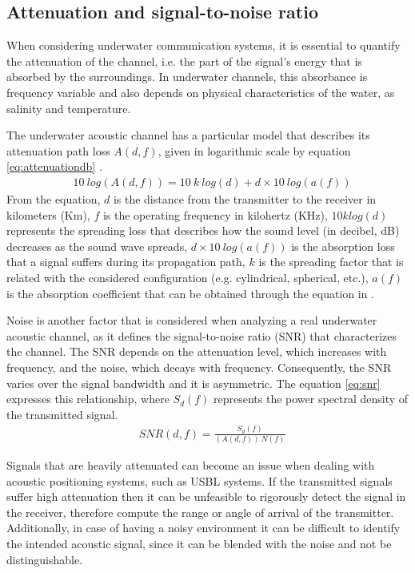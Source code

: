 \subsection{Attenuation and signal-to-noise ratio} \label{subsec:snr}

When considering underwater communication systems, it is essential to quantify the attenuation of the channel, i.e. the part of the signal's energy that is absorbed by the surroundings. In underwater channels, this absorbance is frequency variable and also depends on physical characteristics of the water, as salinity and temperature. 

The underwater acoustic channel has a particular model that describes its attenuation path loss \(A(d,f)\), given in logarithmic scale by equation \ref{eq:attenuationdb} \cite{pathloss}. 
\begin{eqnarray}
&10\ log(A(d,f)) = 10\ k\ log(d) + d \times 10\ log(a(f))
\label{eq:attenuationdb}
\end{eqnarray}
From the equation, \(d\) is the distance from the transmitter to the receiver in kilometers (Km), \(f\) is the operating frequency in kilohertz (KHz), \(10klog(d)\) represents the spreading loss that describes how the sound level (in decibel, dB) decreases as the sound wave spreads, \(d \times 10 \ log(a(f))\) is the absorption loss that a signal suffers during its propagation path, \(k\) is the spreading factor that is related with the considered configuration (e.g. cylindrical, spherical, etc.), \(a(f)\) is the absorption coefficient that can be obtained through the equation in \cite{pathloss}.

Noise is another factor that is considered when analyzing a real underwater acoustic channel, as it defines the signal-to-noise ratio (SNR) that characterizes the channel. The SNR depends on the attenuation level, which increases with frequency, and the noise, which decays with frequency. Consequently, the SNR varies over the signal bandwidth and it is asymmetric. The equation \ref{eq:snr} \cite{commchan} expresses this relationship, where \(S_{d}(f)\) represents the power spectral density of the transmitted signal.
\begin{eqnarray}
&SNR(d,f) = \frac{S_{d}(f)}{(A(d,f))\ N(f)}
\label{eq:snr}
\end{eqnarray}

Signals that are heavily attenuated can become an issue when dealing with acoustic positioning systems, such as USBL systems. If the transmitted signals suffer high attenuation then it can be unfeasible to rigorously detect the signal in the receiver, therefore compute the range or angle of arrival of the transmitter. Additionally, in case of having a noisy environment it can be difficult to identify the intended acoustic signal, since it can be blended with the noise and not be distinguishable. 

